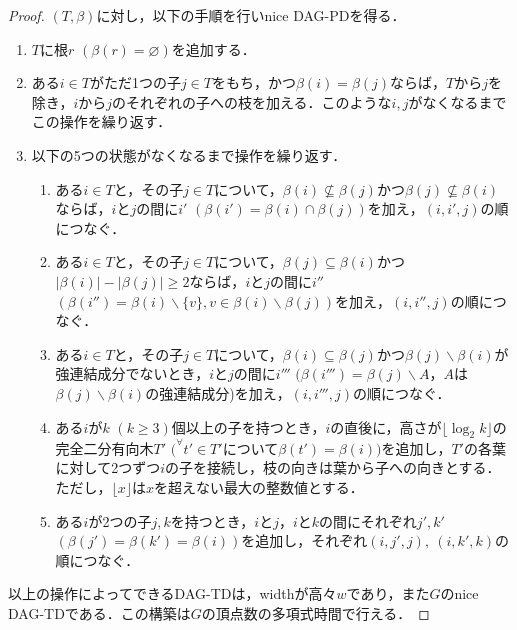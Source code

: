 \documentclass[master]{kuisthesis}		%
\theoremstyle{plain}
\theoremstyle{definition}
\begin{document}
\begin{proof}
    $(T, \beta)$に対し，以下の手順を行いnice DAG-PDを得る．

    \begin{enumerate}
        \item $T$に根$r$ $(\beta(r) = \varnothing)$を追加する．
        \item ある$i \in T$がただ1つの子$j \in T$をもち，かつ$\beta(i) = \beta(j)$ならば，$T$から$j$を除き，$i$から$j$のそれぞれの子への枝を加える．このような$i, j$がなくなるまでこの操作を繰り返す．
        \item 以下の5つの状態がなくなるまで操作を繰り返す．
        \begin{enumerate}
            \item ある$i \in T$と，その子$j \in T$について，$\beta(i) \nsubseteq \beta(j)$かつ$\beta(j) \nsubseteq \beta(i)$ならば，$i$と$j$の間に$i'$ $(\beta(i') = \beta(i) \cap \beta(j))$を加え，$(i, i', j)$の順につなぐ．
            \item ある$i \in T$と，その子$j \in T$について，$\beta(j) \subseteq \beta(i)$かつ$|\beta(i)| - |\beta(j)| \geq 2$ならば，$i$と$j$の間に$i''$ $(\beta(i'') = \beta(i) \backslash \{v\}, v \in \beta(i) \backslash \beta(j))$を加え，$(i, i'', j)$の順につなぐ．
            \item ある$i \in T$と，その子$j \in T$について，$\beta(i) \subseteq \beta(j)$かつ$\beta(j) \backslash \beta(i)$が強連結成分でないとき，$i$と$j$の間に$i'''$ $(\beta(i''') = \beta(j) \backslash A$，$A$は$\beta(j) \backslash \beta(i)$の強連結成分)を加え，$(i, i''', j)$の順につなぐ．
            \item ある$i$が$k$ $(k \geq 3)$個以上の子を持つとき，$i$の直後に，高さが$\lfloor \log_{2} k \rfloor$の完全二分有向木$T'$ $(^{\forall}t' \in T'$について$\beta(t') = \beta(i))$を追加し，$T'$の各葉に対して2つずつ$i$の子を接続し，枝の向きは葉から子への向きとする．ただし，$\lfloor x \rfloor$は$x$を超えない最大の整数値とする．
            \item ある$i$が2つの子$j, k$を持つとき，$i$と$j$，$i$と$k$の間にそれぞれ$j', k'$ $(\beta(j') = \beta(k') = \beta(i))$を追加し，それぞれ$(i, j', j),\ (i, k', k)$の順につなぐ．
        \end{enumerate}
    \end{enumerate}

    以上の操作によってできるDAG-TDは，widthが高々$w$であり，また$G$のnice DAG-TDである．この構築は$G$の頂点数の多項式時間で行える．
\end{proof}
\end{document}
